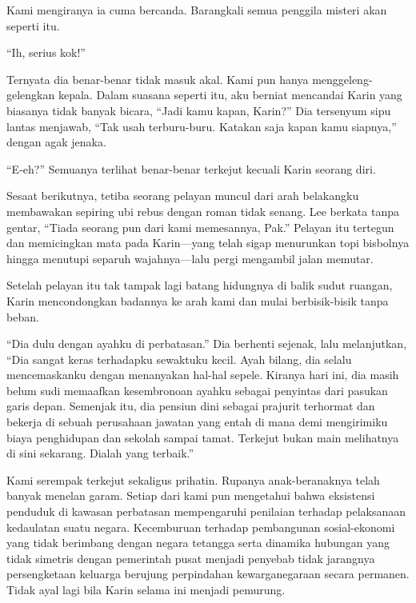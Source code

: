 \documentclass[smalldemyvopaper,11pt,twoside,onecolumn,openright,extrafontsizes]{memoir}
\begin{document}
Kami mengiranya ia cuma bercanda. Barangkali semua penggila misteri akan seperti itu.

``Ih, serius kok!''


Ternyata dia benar-benar tidak masuk akal. Kami pun hanya menggeleng-gelengkan kepala. Dalam suasana seperti itu, aku berniat mencandai Karin yang biasanya tidak banyak bicara, ``Jadi kamu kapan, Karin?'' Dia tersenyum sipu lantas menjawab, ``Tak usah terburu-buru. Katakan saja kapan kamu siapnya,'' dengan agak jenaka.

``E-eh?'' Semuanya terlihat benar-benar terkejut kecuali Karin seorang diri.


Sesaat berikutnya, tetiba seorang pelayan muncul dari arah belakangku membawakan sepiring ubi rebus dengan roman tidak senang. Lee berkata tanpa gentar, ``Tiada seorang pun dari kami memesannya, Pak.'' Pelayan itu tertegun dan memicingkan mata pada Karin---yang telah sigap menurunkan topi bisbolnya hingga menutupi separuh wajahnya---lalu pergi mengambil jalan memutar.

Setelah pelayan itu tak tampak lagi batang hidungnya di balik sudut ruangan, Karin mencondongkan badannya ke arah kami dan mulai berbisik-bisik tanpa beban.

``Dia dulu dengan ayahku di perbatasan.'' Dia berhenti sejenak, lalu melanjutkan, ``Dia sangat keras terhadapku sewaktuku kecil. Ayah bilang, dia selalu mencemaskanku dengan menanyakan hal-hal sepele. Kiranya hari ini, dia masih belum sudi memaafkan kesembronoan ayahku sebagai penyintas dari pasukan garis depan. Semenjak itu, dia pensiun dini sebagai prajurit terhormat dan bekerja di sebuah perusahaan jawatan yang entah di mana demi mengirimiku biaya penghidupan dan sekolah sampai tamat. Terkejut bukan main melihatnya di sini sekarang. Dialah yang terbaik.''


Kami serempak terkejut sekaligus prihatin. Rupanya anak-beranaknya telah banyak menelan garam. Setiap dari kami pun mengetahui bahwa eksistensi penduduk di kawasan perbatasan mempengaruhi penilaian terhadap pelaksanaan kedaulatan suatu negara. Kecemburuan terhadap pembangunan sosial-ekonomi yang tidak berimbang dengan negara tetangga serta dinamika hubungan yang tidak simetris dengan pemerintah pusat menjadi penyebab tidak jarangnya persengketaan keluarga berujung perpindahan kewarganegaraan secara permanen. Tidak ayal lagi bila Karin selama ini menjadi pemurung.
\end{document}
